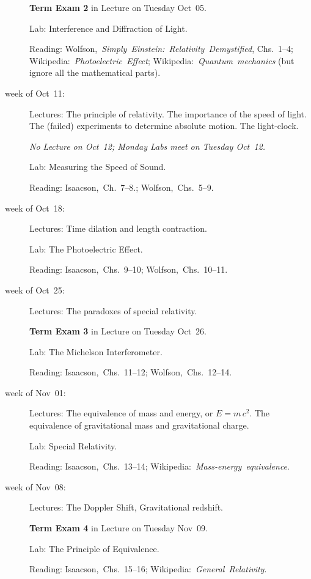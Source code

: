 \documentclass[12pt, letterpaper]{article}
\begin{document}
\begin{description}
  \textbf{Term Exam 2} in Lecture on Tuesday Oct~05.

  Lab: Interference and Diffraction of Light.

  Reading:
  Wolfson,~\textit{Simply~Einstein:~Relativity~Demystified}, Chs.~1--4;
  Wikipedia:~\textit{Photoelectric~Effect};
  Wikipedia:~\textit{Quantum~mechanics} (but ignore all the mathematical parts).

\item[week of Oct~11:] Lectures: The principle of relativity. The
  importance of the speed of light. The (failed) experiments to
  determine absolute motion. The light-clock.

  \textsl{No Lecture on Oct~12; Monday Labs meet on Tuesday Oct~12.}

  Lab: Measuring the Speed of Sound.

  Reading:
  Isaacson,~Ch.~7--8.;
  Wolfson,~Chs.~5--9.

\item[week of Oct~18:] Lectures: Time dilation and length contraction.

  Lab: The Photoelectric Effect.

  Reading:
  Isaacson,~Chs.~9--10;
  Wolfson,~Chs.~10--11.

\item[week of Oct~25:] Lectures: The paradoxes of special relativity.

  \textbf{Term Exam 3} in Lecture on Tuesday Oct~26.

  Lab: The Michelson Interferometer.

  Reading: Isaacson,~Chs.~11--12;
           Wolfson,~Chs.~12--14.

\item[week of Nov~01:] Lectures: The equivalence of mass and energy,
  or $E = m\,c^2$. The equivalence of gravitational mass and
  gravitational charge.

  Lab: Special Relativity.

  Reading: Isaacson,~Chs.~13--14;
  Wikipedia:~\textit{Mass-energy~equivalence}.

\item[week of Nov~08:] Lectures: The Doppler Shift, Gravitational redshift.

  \textbf{Term Exam 4} in Lecture on Tuesday Nov~09.

  Lab: The Principle of Equivalence.

  Reading: Isaacson,~Chs.~15--16;
  Wikipedia:~\textit{General~Relativity}.


\end{description}
\end{document}
